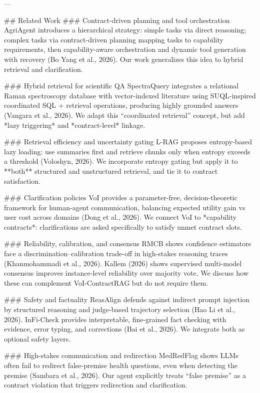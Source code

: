---

## Related Work
### Contract-driven planning and tool orchestration
AgriAgent introduces a hierarchical strategy: simple tasks via direct reasoning; complex tasks via contract-driven planning mapping tasks to capability requirements, then capability-aware orchestration and dynamic tool generation with recovery (Bo Yang et al., 2026). Our work generalizes this idea to hybrid retrieval and clarification.

### Hybrid retrieval for scientific QA
SpectraQuery integrates a relational Raman spectroscopy database with vector-indexed literature using SUQL-inspired coordinated SQL + retrieval operations, producing highly grounded answers (Vangara et al., 2026). We adapt this “coordinated retrieval” concept, but add *lazy triggering* and *contract-level* linkage.

### Retrieval efficiency and uncertainty gating
L-RAG proposes entropy-based lazy loading: use summaries first and retrieve chunks only when entropy exceeds a threshold (Voloshyn, 2026). We incorporate entropy gating but apply it to **both** structured and unstructured retrieval, and tie it to contract satisfaction.

### Clarification policies
VoI provides a parameter-free, decision-theoretic framework for human-agent communication, balancing expected utility gain vs user cost across domains (Dong et al., 2026). We connect VoI to *capability contracts*: clarifications are asked specifically to satisfy unmet contract slots.

### Reliability, calibration, and consensus
RMCB shows confidence estimators face a discrimination–calibration trade-off in high-stakes reasoning traces (Khanmohammadi et al., 2026). Kallem (2026) shows supervised multi-model consensus improves instance-level reliability over majority vote. We discuss how these can complement VoI-ContractRAG but do not require them.

### Safety and factuality
ReasAlign defends against indirect prompt injection by structured reasoning and judge-based trajectory selection (Hao Li et al., 2026). InFi-Check provides interpretable, fine-grained fact checking with evidence, error typing, and corrections (Bai et al., 2026). We integrate both as optional safety layers.

### High-stakes communication and redirection
MedRedFlag shows LLMs often fail to redirect false-premise health questions, even when detecting the premise (Sambara et al., 2026). Our agent explicitly treats “false premise” as a contract violation that triggers redirection and clarification.

